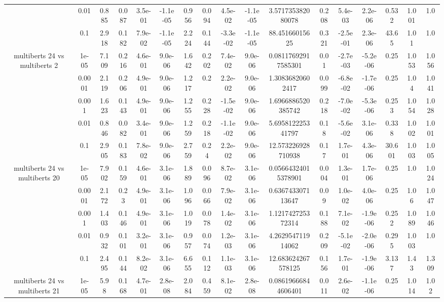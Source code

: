 \begin{tabular}{|c|c|c|c|c|c|c|c|c|c|c|c|c|c|c|c|c|}
 & 0.01 & 0.885 & 0.087 & 3.5e-01 & -1.1e-05 & 0.956 & 0.094 & 4.5e-02 & -1.1e-05 & 3.571735382080078 & 0.208 & 5.4e-03 & 2.2e-06 & 0.532 & 1.001 & 1.0 \\
 & 0.1 & 2.918 & 0.182 & 7.9e-02 & -1.1e-05 & 2.224 & 0.144 & -3.3e-02 & -1.1e-05 & 88.45166015625 & 0.321 & -2.5e-01 & 2.3e-06 & 43.65 & 1.01 & 1.0 \\
\hline
\multirow{5}{*}{multiberts 24 vs multiberts 2} & 1e-05 & 7.109 & 0.216 & 4.6e-01 & 9.0e-06 & 1.642 & 0.202 & 7.4e-02 & 9.0e-06 & 0.08117692917585301 & 0.01 & -2.7e-03 & -5.2e-06 & 0.25 & 1.053 & 1.056 \\
 & 0.0001 & 2.119 & 0.206 & 4.9e-01 & 9.0e-06 & 1.217 & 0.2 & 2.2e-02 & 9.0e-06 & 1.30836820602417 & 0.099 & -6.8e-02 & -1.7e-06 & 0.25 & 1.04 & 1.041 \\
 & 0.001 & 1.623 & 0.143 & 4.9e-01 & 9.0e-06 & 1.255 & 0.228 & -1.5e-02 & 9.0e-06 & 1.6966886520385742 & 0.218 & -7.0e-02 & -5.3e-06 & 0.253 & 1.054 & 1.028 \\
 & 0.01 & 0.846 & 0.082 & 3.4e-01 & 9.0e-06 & 1.259 & 0.218 & -1.1e-02 & 9.0e-06 & 5.695812225341797 & 0.18 & -5.6e-02 & 3.1e-06 & 0.338 & 1.002 & 1.001 \\
 & 0.1 & 2.905 & 0.183 & 7.8e-02 & 9.0e-06 & 2.759 & 0.24 & 2.2e-02 & 9.0e-06 & 12.573226928710938 & 0.17 & 1.7e-01 & 4.3e-06 & 30.601 & 1.003 & 1.005 \\
\hline
\multirow{5}{*}{multiberts 24 vs multiberts 20} & 1e-05 & 7.902 & 0.159 & 4.6e-01 & 3.1e-06 & 1.889 & 0.096 & 8.7e-02 & 3.1e-06 & 0.05664324015378901 & 0.004 & 1.3e-01 & 1.7e-06 & 0.25 & 1.0 & 1.024 \\
 & 0.0001 & 2.172 & 0.23 & 4.9e-01 & 3.1e-06 & 1.096 & 0.066 & 7.9e-02 & 3.1e-06 & 0.636743307113647 & 0.09 & 1.0e-02 & 4.0e-06 & 0.25 & 1.06 & 1.047 \\
 & 0.001 & 1.403 & 0.146 & 4.9e-01 & 3.1e-06 & 1.019 & 0.078 & 1.4e-02 & 3.1e-06 & 1.121742725372314 & 0.188 & 7.1e-02 & -1.9e-06 & 0.252 & 1.089 & 1.046 \\
 & 0.01 & 0.932 & 0.101 & 3.2e-01 & 3.1e-06 & 0.957 & 0.074 & 1.2e-03 & 3.1e-06 & 4.262954711914062 & 0.209 & -5.1e-02 & -2.0e-06 & 0.295 & 1.003 & 1.0 \\
 & 0.1 & 2.495 & 0.144 & 8.2e-02 & 3.1e-06 & 6.655 & 0.112 & 1.1e-03 & 3.1e-06 & 12.683624267578125 & 0.156 & 1.7e-01 & -1.9e-06 & 3.137 & 1.43 & 1.309 \\
\hline
\multirow{5}{*}{multiberts 24 vs multiberts 21} & 1e-05 & 5.98 & 0.168 & 4.7e-01 & 2.8e-08 & 2.084 & 0.459 & 8.1e-02 & 2.8e-08 & 0.08619666844606401 & 0.011 & 2.6e-02 & -1.1e-06 & 0.25 & 1.014 & 1.02 \\

\end{tabular}
